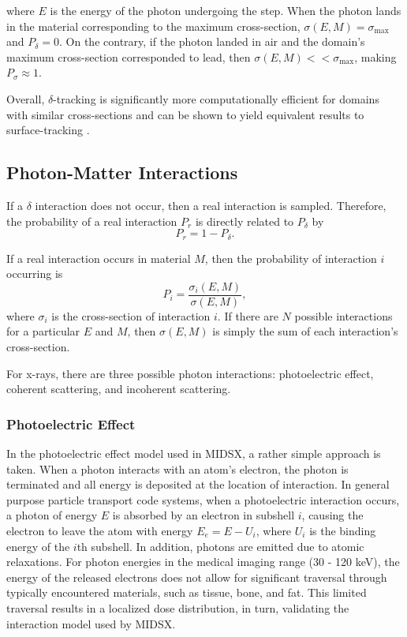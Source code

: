 where $E$ is the energy of the photon undergoing the step. When the photon lands in the material corresponding to the maximum cross-section, $\sigma(E, M) = \sigma_{\text{max}}$ and $P_{\delta} = 0$. On the contrary, if the photon landed in air and the domain's maximum cross-section corresponded to lead, then $\sigma(E, M) << \sigma_{\text{max}}$, making $P_{\sigma} \approx 1$.

\par Overall, $\delta$-tracking is significantly more computationally efficient for domains with similar cross-sections and can be shown to yield equivalent results to surface-tracking \cite{vassiliev_monte_2017}.

\subsection{Photon-Matter Interactions}
\par If a $\delta$ interaction does not occur, then a real interaction is sampled. Therefore, the probability of a real interaction $P_r$ is directly related to $P_\delta$ by
\begin{equation}
    P_r = 1 - P_\delta.
\end{equation}
\par If a real interaction occurs in material $M$, then the probability of interaction $i$ occurring is 
\begin{equation}
P_i = \frac{\sigma_i(E, M)}{\sigma (E, M)},
\end{equation}
where $\sigma_i$ is the cross-section of interaction $i$. If there are $N$ possible interactions for a particular $E$ and $M$, then $\sigma (E, M)$ is simply the sum of each interaction's cross-section.

\par For x-rays, there are three possible photon interactions: photoelectric effect, coherent scattering, and incoherent scattering.

\subsubsection{Photoelectric Effect}

\par In the photoelectric effect model used in MIDSX, a rather simple approach is taken. When a photon interacts with an atom's electron, the photon is terminated and all energy is deposited at the location of interaction. In general purpose particle transport code systems, when a photoelectric interaction occurs, a photon of energy $E$ is absorbed by an electron in subshell $i$, causing the electron to leave the atom with energy $E_e = E - U_i$, where $U_i$ is the binding energy of the $i$th subshell. In addition, photons are emitted due to atomic relaxations. For photon energies in the medical imaging range (30 - 120 keV), the energy of the released electrons does not allow for significant traversal through typically encountered materials, such as tissue, bone, and fat. This limited traversal results in a localized dose distribution, in turn, validating the interaction model used by MIDSX.

